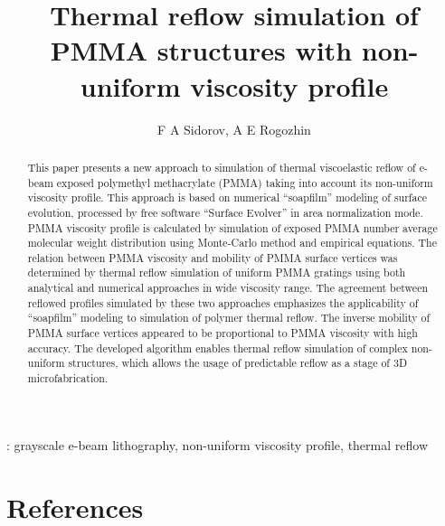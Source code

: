 \documentclass[12pt]{iopart}
\begin{document}
\title{Thermal reflow simulation of PMMA structures with non-uniform viscosity profile}
\author{F A Sidorov, A E Rogozhin}
\address{Valiev Institute of Physics and Technology, Russian Academy of Sciences, Moscow, 117218 Russia}

\vspace{10pt}

\begin{abstract}
This paper presents a new approach to simulation of thermal viscoelastic reflow of e-beam exposed polymethyl methacrylate (PMMA) taking into account its non-uniform viscosity profile.
This approach is based on numerical ``soapfilm'' modeling of surface evolution, processed by free software ``Surface Evolver'' in area normalization mode.
PMMA viscosity profile is calculated by simulation of exposed PMMA number average molecular weight distribution using Monte-Carlo method and empirical equations.
The relation between PMMA viscosity and mobility of PMMA surface vertices was determined by thermal reflow simulation of uniform PMMA gratings using both analytical and numerical approaches in wide viscosity range.
The agreement between reflowed profiles simulated by these two approaches emphasizes the applicability of ``soapfilm'' modeling to simulation of polymer thermal reflow. 
The inverse mobility of PMMA surface vertices appeared to be proportional to PMMA viscosity with high accuracy.
The developed algorithm enables thermal reflow simulation of complex non-uniform structures, which allows the usage of predictable reflow as a stage of 3D microfabrication.
\end{abstract}

\vspace{2pc}

: grayscale e-beam lithography, non-uniform viscosity profile, thermal reflow






\section*{References}

\end{document}
